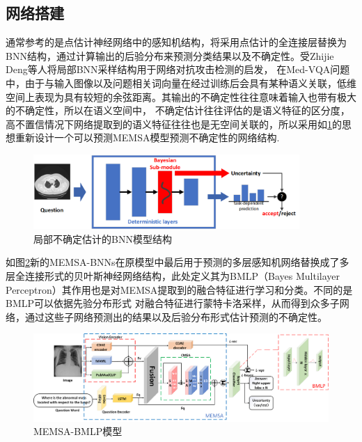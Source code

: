 \subsection{网络搭建}
通常参考的是点估计神经网络中的感知机结构，将采用点估计的全连接层替换为BNN结构，通过计算输出的后验分布来预测分类结果以及不确定性。受Zhijie Deng等人\cite{deng2021libre}将局部BNN采样结构用于网络对抗攻击检测的启发，
在Med-VQA问题中，由于与输入图像以及问题相关词向量在经过训练后会具有某种语义关联，低维空间上表现为具有较短的余弦距离。其输出的不确定性往往意味着输入也带有极大的不确定性，所以在语义空间中，
不确定估计往往评估的是语义特征的区分度，高不置信情况下网络提取到的语义特征往往也是无空间关联的，所以采用如\ref{bnn-sublayer}的思想重新设计一个可以预测MEMSA模型预测不确定性的网络结构.
\begin{figure}[htbp]
	\centering	
	\includegraphics[width=0.9\textwidth]{Fig/myfig/chapter4/bnn-sublayer.png}  %
	\caption{\label{bnn-sublayer}局部不确定估计的BNN模型结构} 
\end{figure}

如图\ref{memsabnns}新的MEMSA-BNNs在原模型中最后用于预测的多层感知机网络替换成了多层全连接形式的贝叶斯神经网络结构，此处定义其为BMLP（Bayes Multilayer Perceptron）其作用也是对MEMSA提取到的融合特征进行学习和分类。不同的是BMLP可以依据先验分布形式
对融合特征进行蒙特卡洛采样，从而得到众多子网络，通过这些子网络预测出的结果以及后验分布形式估计预测的不确定性。
\begin{figure}[htbp]
	\centering	
	\includegraphics[width=1\textwidth]{Fig/myfig/chapter4/memsabnns.png}  %
	\caption{\label{memsabnns}MEMSA-BMLP模型} 
\end{figure}
